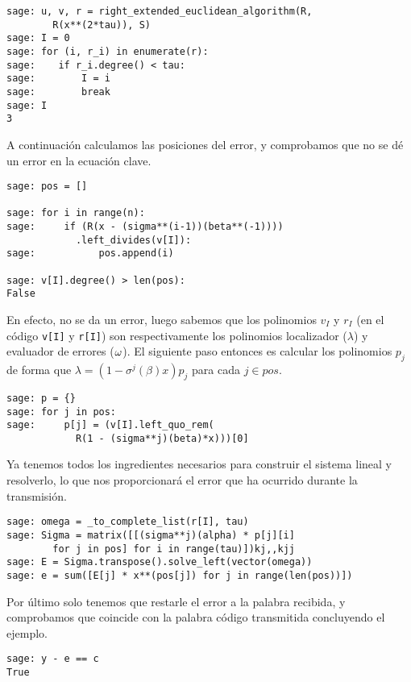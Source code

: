 \begin{exampleth}
\begin{lstlisting}
sage: u, v, r = right_extended_euclidean_algorithm(R,
        R(x**(2*tau)), S)
sage: I = 0
sage: for (i, r_i) in enumerate(r):
sage:    if r_i.degree() < tau:
sage:        I = i
sage:        break
sage: I
3
\end{lstlisting}

A continuación calculamos las posiciones del error, y comprobamos que no se dé un error en la ecuación clave.
\begin{lstlisting}
sage: pos = []

sage: for i in range(n):
sage:     if (R(x - (sigma**(i-1))(beta**(-1))))
            .left_divides(v[I]):
sage:           pos.append(i)

sage: v[I].degree() > len(pos):
False
\end{lstlisting}

En efecto, no se da un error, luego sabemos que los polinomios \(v_I\) y  \(r_I\) (en el código \texttt{v[I]} y \texttt{r[I]}) son respectivamente los polinomios localizador (\(\lambda\)) y evaluador de errores (\(\omega\)). El siguiente paso entonces es calcular los polinomios \(p_j\) de forma que \(\lambda = (1 - \sigma^{j}(\beta)x)p_j \) para cada \(j \in pos\).

\begin{lstlisting}
sage: p = {}
sage: for j in pos:
sage:     p[j] = (v[I].left_quo_rem(
            R(1 - (sigma**j)(beta)*x)))[0]
\end{lstlisting}

Ya tenemos todos los ingredientes necesarios para construir el sistema lineal y resolverlo, lo que nos proporcionará el error que ha ocurrido durante la transmisión.

\begin{lstlisting}
sage: omega = _to_complete_list(r[I], tau)
sage: Sigma = matrix([[(sigma**j)(alpha) * p[j][i]
        for j in pos] for i in range(tau)])kj,,kjj
sage: E = Sigma.transpose().solve_left(vector(omega))
sage: e = sum([E[j] * x**(pos[j]) for j in range(len(pos))])
\end{lstlisting}

Por último solo tenemos que restarle el error a la palabra recibida, y comprobamos que coincide con la palabra código transmitida concluyendo el ejemplo.

\begin{lstlisting}
sage: y - e == c
True
\end{lstlisting}
\end{exampleth}

